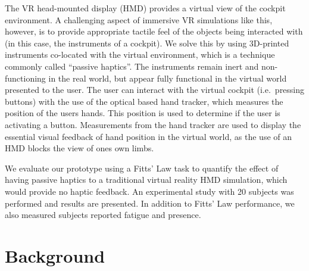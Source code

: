 \documentclass[]{aiaa-tc}%
\begin{document}
The VR head-mounted display (HMD) provides a virtual view of the cockpit environment.
A challenging aspect of immersive VR simulations like this, however, is to provide appropriate tactile feel of the objects being interacted with (in this case, the instruments of a cockpit).
We solve this by using 3D-printed instruments co-located with the virtual environment, which is a technique commonly called ``passive haptics''.
The instruments remain inert and non-functioning in the real world, but appear fully functional in the virtual world presented to the user.
The user can interact with the virtual cockpit (i.e.\ pressing buttons) with the use of the optical based hand tracker, which measures the position of the users hands.
This position is used to determine if the user is activating a button.
Measurements from the hand tracker are used to display the essential visual feedback of hand position in the virtual world, as the use of an HMD blocks the view of ones own limbs.

We evaluate our prototype using a Fitts' Law task to quantify the effect of having passive haptics to a traditional virtual reality HMD simulation, which would provide no haptic feedback.
An experimental study with 20 subjects was performed and results are presented.
In addition to Fitts' Law performance, we also measured subjects reported fatigue and presence.

\section{Background}
\end{document}
